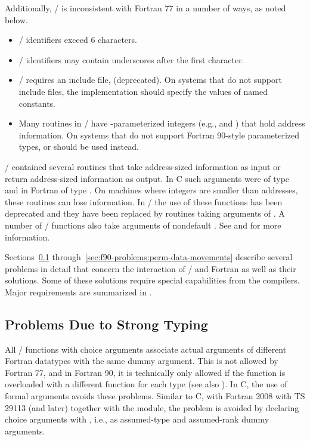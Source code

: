 Additionally, \MPI/ is inconsistent with Fortran 77 in a number of
ways, as noted below.
\begin{itemize}
\item \MPI/ identifiers exceed 6 characters.
\item \MPI/ identifiers may contain underscores after the first character.
\item \MPI/ requires an include file,  (deprecated). On systems
that do not support include files, the implementation should specify
the values of named constants.
\item Many routines in
\MPI/
have -parameterized integers
(e.g.,  and )
that hold address information.
On systems that do not support Fortran 90-style parameterized
types,  or  should be used instead.
\end{itemize}

\MPII/ contained several routines that take address-sized information
as input or return address-sized information as output. In C
such arguments were of type  and in Fortran of
type . On machines where integers are smaller than
addresses, these routines can lose information. In \MPIII/ the
use of these functions has been deprecated
and they have been replaced by
routines taking  arguments of .
A number of \MPIII/ functions also take  arguments
of nondefault . See  and
 for more information.

Sections~\ref{sec:f90-problems:strong-typing} through~\ref{sec:f90-problems:perm-data-movements}
describe several problems in detail that concern the interaction of \MPI/ and Fortran as well as their solutions.
Some of these solutions require special capabilities from the compilers.
Major requirements are summarized in
.

\subsection{Problems Due to Strong Typing}
\label{sec:f90-problems:strong-typing}

All \MPI/ functions with choice arguments associate actual arguments
of different Fortran datatypes with the same dummy argument.  This is
not allowed by Fortran 77, and in Fortran 90, it is technically
only allowed if the function is overloaded with a different function
for each type
(see also ).
In C, the use of  formal arguments avoids these problems.
Similar to C, with Fortran 2008 with TS 29113
(and later) together with
the  module, the problem is avoided
by declaring choice arguments with ,
i.e., as assumed-type and assumed-rank dummy arguments.

